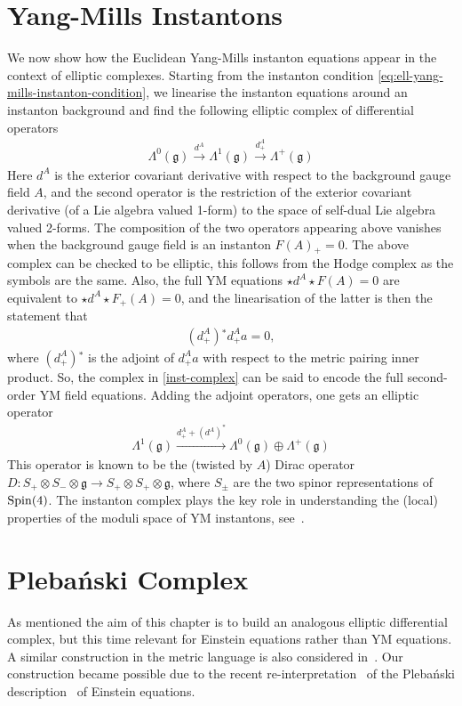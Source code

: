 \documentclass[10pt]{report}
\newcommand{\pleb}[0]{Pleba\'nski}
\theoremstyle{definition}
\begin{document}
\section{Yang-Mills Instantons}
We now show how the Euclidean Yang-Mills instanton equations appear in the context of elliptic complexes. Starting from the instanton condition \cref{eq:ell-yang-mills-instanton-condition}, we linearise the instanton equations around an instanton background and find the following elliptic complex of differential operators
\begin{align} \label{inst-complex}
    \Lambda^0(\mathfrak{g}) \overset{d^A}{\longrightarrow} \Lambda^1(\mathfrak{g}) \overset{d^A_+}{\longrightarrow} \Lambda^+(\mathfrak{g})
\end{align}
Here $d^A$ is the exterior covariant derivative with respect to the background gauge field $A$, and the second operator is the restriction of the exterior covariant derivative (of a Lie algebra valued 1-form) to the space of self-dual Lie algebra valued 2-forms. The composition of the two operators appearing above vanishes when the background gauge field is an instanton $F(A){}_+=0$. The above complex can be checked to be elliptic, this follows from the Hodge complex as the symbols are the same. Also, the full YM equations $\star d^A \star F(A)=0$ are equivalent to $\star d^A \star F_+(A)=0$, and the linearisation of the latter is then the statement that
\begin{align}\label{dd-star-YM}
    (d^A_+){}^* d^A_+ a = 0,
\end{align}
where $(d^A_+){}^*$ is the adjoint of $d^A_+ a$ with respect to the metric pairing inner product. So, the complex in \cref{inst-complex} can be said to encode the full second-order YM field equations. Adding the adjoint operators, one gets an elliptic operator
\begin{align}  \label{dirac-YM}
    \Lambda^1(\mathfrak{g}) \overset{d^A_+ + {(d^A)}^*}{\longrightarrow} \Lambda^0(\mathfrak{g}) \oplus \Lambda^+(\mathfrak{g})
\end{align}
This operator is known to be the (twisted by $A$) Dirac operator $D: S_+\otimes S_- \otimes \mathfrak{g} \to S_+\otimes S_+ \otimes \mathfrak{g}$, where $S_\pm$ are the two spinor representations of ${\rm Spin}(4)$. The instanton complex plays the key role in understanding the (local) properties of the moduli space of YM instantons, see~\cite{Donaldson:1983wm}.


\section{\pleb{} Complex}
As mentioned the aim of this chapter is to build an analogous elliptic differential complex, but this time relevant for Einstein equations rather than YM equations. A similar construction in the metric language is also considered in~\cite{The_linearised_Eastwo_2022}. Our construction became possible due to the recent re-interpretation~\cite{Su2StructureBhoja2024} of the \pleb{} description~\cite{OnTheSeparatiPleban1977} of Einstein equations.
\end{document}
